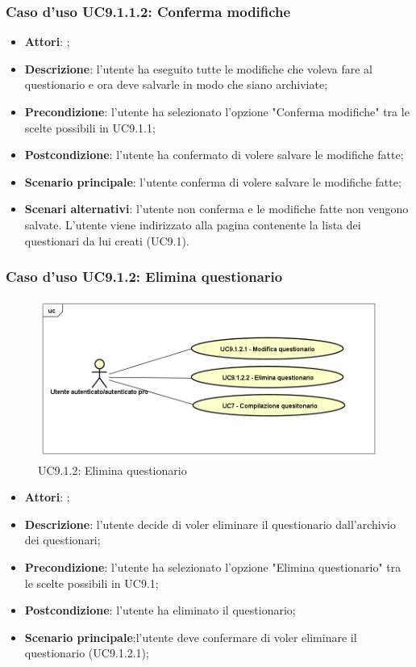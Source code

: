 					\subsubsection{Caso d'uso UC9.1.1.2: Conferma modifiche}
					\label{UC9.1.1.2}
					\begin{itemize}
						\item \textbf{Attori}: \uaupro;
						\item \textbf{Descrizione}: l'utente ha eseguito tutte le modifiche che voleva fare al questionario e ora deve salvarle in modo che siano archiviate;
						\item \textbf{Precondizione}: l'utente ha selezionato l'opzione "Conferma modifiche" tra le scelte possibili in UC9.1.1;
						\item \textbf{Postcondizione}: l'utente ha confermato di volere salvare le modifiche fatte;
						\item \textbf{Scenario principale}: l'utente conferma di volere salvare le modifiche fatte;
						\item \textbf{Scenari alternativi}: l'utente non conferma e le modifiche fatte non vengono salvate. L'utente viene indirizzato alla pagina contenente la lista dei questionari da lui creati (UC9.1).
					\end{itemize}
										
			\subsubsection{Caso d'uso UC9.1.2: Elimina questionario}
			\label{UC9.1.2}
			\begin{figure}[h]
				\centering
			\includegraphics[scale=0.5,keepaspectratio]{UML/UC9_1_2.png}
				\caption{UC9.1.2: Elimina questionario}
			\end{figure}
			\FloatBarrier
			\begin{itemize}
				\item \textbf{Attori}: \uaupro;
				\item \textbf{Descrizione}: l'utente decide di voler eliminare il questionario dall'archivio dei questionari;
				\item \textbf{Precondizione}: l'utente ha selezionato l'opzione "Elimina questionario" tra le scelte possibili in UC9.1;
				\item \textbf{Postcondizione}: l'utente ha eliminato il questionario;
				\item \textbf{Scenario principale}:l'utente deve confermare di voler eliminare il questionario (UC9.1.2.1);
			\end{itemize}
			
